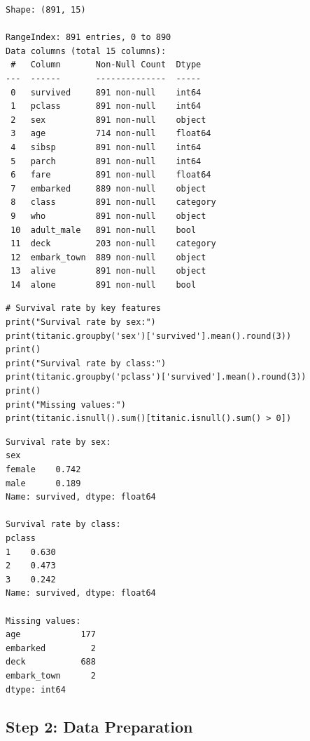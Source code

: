 \begin{codeoutput}
\begin{verbatim}
Shape: (891, 15)

RangeIndex: 891 entries, 0 to 890
Data columns (total 15 columns):
 #   Column       Non-Null Count  Dtype
---  ------       --------------  -----
 0   survived     891 non-null    int64
 1   pclass       891 non-null    int64
 2   sex          891 non-null    object
 3   age          714 non-null    float64
 4   sibsp        891 non-null    int64
 5   parch        891 non-null    int64
 6   fare         891 non-null    float64
 7   embarked     889 non-null    object
 8   class        891 non-null    category
 9   who          891 non-null    object
 10  adult_male   891 non-null    bool
 11  deck         203 non-null    category
 12  embark_town  889 non-null    object
 13  alive        891 non-null    object
 14  alone        891 non-null    bool
\end{verbatim}
\end{codeoutput}

\begin{codeblock}[title=\textbf{Python}]
\begin{verbatim}
# Survival rate by key features
print("Survival rate by sex:")
print(titanic.groupby('sex')['survived'].mean().round(3))
print()
print("Survival rate by class:")
print(titanic.groupby('pclass')['survived'].mean().round(3))
print()
print("Missing values:")
print(titanic.isnull().sum()[titanic.isnull().sum() > 0])
\end{verbatim}
\end{codeblock}

\begin{codeoutput}
\begin{verbatim}
Survival rate by sex:
sex
female    0.742
male      0.189
Name: survived, dtype: float64

Survival rate by class:
pclass
1    0.630
2    0.473
3    0.242
Name: survived, dtype: float64

Missing values:
age            177
embarked         2
deck           688
embark_town      2
dtype: int64
\end{verbatim}
\end{codeoutput}

\subsection{Step 2: Data Preparation}


